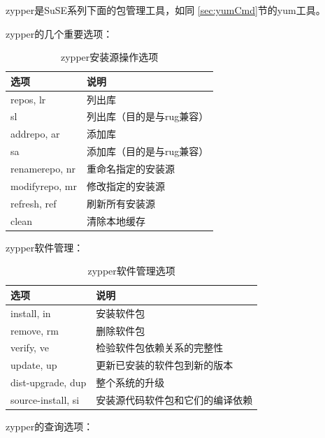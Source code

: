 zypper是SuSE系列下面的包管理工具，如同
\ref{sec:yumCmd}节的yum工具。

zypper的几个重要选项：

\begin{table}[!h]
  \centering
    \begin{tabular}{ll}
      \toprule
      选项           & 说明 \\
      \midrule
      repos, lr      & 列出库 \\
      sl             & 列出库（目的是与rug兼容） \\
      addrepo, ar    & 添加库 \\
      sa             & 添加库（目的是与rug兼容） \\
      renamerepo, nr & 重命名指定的安装源 \\
      modifyrepo, mr & 修改指定的安装源 \\
      refresh, ref   & 刷新所有安装源 \\
      clean          & 清除本地缓存 \\
      \bottomrule
    \end{tabular}
    \caption{zypper安装源操作选项}
\end{table}

zypper软件管理：

\begin{table}[!h]
  \centering
    \begin{tabular}{ll}
      \toprule
      选项               & 说明 \\
      \midrule
      install, in        & 安装软件包 \\
      remove, rm         & 删除软件包 \\
      verify, ve         & 检验软件包依赖关系的完整性 \\
      update, up         & 更新已安装的软件包到新的版本 \\
      dist-upgrade, dup  & 整个系统的升级 \\
      source-install, si & 安装源代码软件包和它们的编译依赖 \\
      \bottomrule
    \end{tabular}
    \caption{zypper软件管理选项}
\end{table}

zypper的查询选项：


